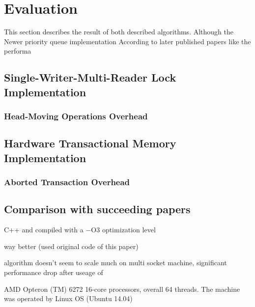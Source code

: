 
\section{Evaluation}

This section describes the result of both described algorithms. Although the   Newer priority queue implementation According to later published papers like \cite{braginsky_cbpq:_2016, } the performa



\subsection{Single-Writer-Multi-Reader Lock Implementation}

\subsubsection{Head-Moving Operations Overhead}

\subsection{Hardware Transactional Memory Implementation}

\subsubsection{Aborted Transaction Overhead}

\subsection{Comparison with succeeding papers}

C++ and compiled with a −O3 optimization level

\cite{braginsky_cbpq:_2016, } way better (used original code of this paper)

algorithm doesn't seem to scale much on multi socket machine, significant performance drop after useage of

AMD Opteron (TM) 6272
16-core processors, overall 64 threads. The machine was operated by Linux OS
(Ubuntu 14.04)